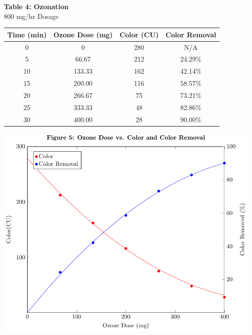 \begin{center}

{\large{\bf Table 4: Ozonation\\}}
{800 mg/hr Dosage\\}
\vspace{3 mm}
\begin{tabular}{|c c c c|}
    \hline
    \textbf{Time (min)} & \textbf{Ozone Dose (mg)} & \textbf{Color (CU)} & \textbf{Color Removal}\\\hline
    0  & 0      & 280 & N/A                     \\
    5  & 66.67  & 212 & 24.29\%                 \\
    10 & 133.33 & 162 & 42.14\%                 \\
    15 & 200.00 & 116 & 58.57\%                 \\
    20 & 266.67 & 75  & 73.21\%                 \\
    25 & 333.33 & 48  & 82.86\%                 \\
    30 & 400.00 & 28  & 90.00\%                 \\\hline
\end{tabular}

\includegraphics*[page=1]{figs/fig5.pdf}

\end{center}
